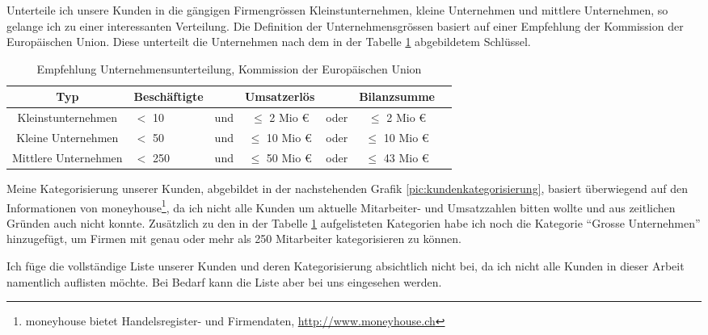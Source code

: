Unterteile ich unsere Kunden in die gängigen Firmengrössen Kleinstunternehmen,
kleine Unternehmen und mittlere Unternehmen, so gelange ich zu einer interessanten 
Verteilung. Die Definition der Unternehmensgrössen basiert auf einer Empfehlung
der Kommission der Europäischen Union\cite[Anhang Art. 2]{eu_komission_unternehmen}.
Diese unterteilt die Unternehmen nach dem in der 
Tabelle \ref{tab:eu_unterteilung} abgebildetem Schlüssel.

\begin{table}[h]
\begin{center}
    \begin{tabular}{clccccc}
        \toprule \textbf{Typ} & \textbf{Beschäftigte} & & \textbf{Umsatzerlös} & & \textbf{Bilanzsumme} \\
        \midrule Kleinstunternehmen & $<$ 10 & und & $\leq$ 2 Mio \euro & oder & $\leq$ 2 Mio \euro \\
        \midrule Kleine Unternehmen & $<$ 50 & und & $\leq$ 10 Mio \euro & oder & $\leq$ 10 Mio \euro \\
        \midrule Mittlere Unternehmen & $<$ 250 & und & $\leq$ 50 Mio \euro & oder & $\leq$ 43 Mio \euro \\
        \bottomrule
    \end{tabular}
    \caption{Empfehlung Unternehmensunterteilung, Kommission der Europäischen Union}
    \label{tab:eu_unterteilung}
\end{center}
\end{table}

Meine Kategorisierung unserer Kunden, abgebildet in der nachstehenden Grafik \ref{pic:kundenkategorisierung},
basiert überwiegend auf den Informationen von moneyhouse\footnote{moneyhouse bietet Handelsregister- und Firmendaten, \url{http://www.moneyhouse.ch}}, 
da ich nicht alle Kunden um aktuelle Mitarbeiter- und Umsatzzahlen bitten wollte
und aus zeitlichen Gründen auch nicht konnte. Zusätzlich zu den in der Tabelle 
\ref{tab:eu_unterteilung} aufgelisteten Kategorien habe ich noch die Kategorie 
``Grosse Unternehmen'' hinzugefügt, um Firmen mit genau oder mehr als 250 
Mitarbeiter kategorisieren zu können.

Ich füge die vollständige Liste unserer Kunden und deren Kategorisierung absichtlich
nicht bei, da ich nicht alle Kunden in dieser Arbeit namentlich auflisten möchte.
Bei Bedarf kann die Liste aber bei uns eingesehen werden.

